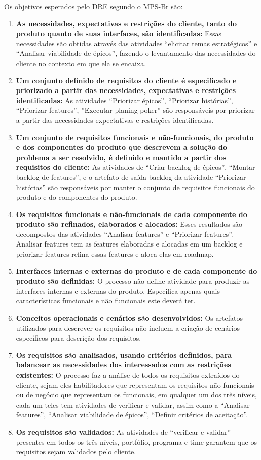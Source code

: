 Os objetivos esperados pelo DRE segundo o MPS-Br são:
\begin{enumerate}
\item \textbf{As necessidades, expectativas e restrições do cliente, tanto do produto quanto de suas interfaces, são identificadas:} Essas necessidades são obtidas através das atividades “elicitar temas estratégicos” e “Analisar viabilidade de épicos”, fazendo o levantamento das necessidades do cliente no contexto em que ela se encaixa.
\item \textbf{Um conjunto definido de requisitos do cliente é especificado e priorizado a partir das necessidades, expectativas e restrições identificadas:} As atividades “Priorizar épicos”, “Priorizar histórias”, “Priorizar features”, ”Executar planing poker” são responsáveis por priorizar a partir das necessidades expectativas e restrições identificadas.
\item \textbf{Um conjunto de requisitos funcionais e não-funcionais, do produto e dos componentes do produto que descrevem a solução do problema a ser resolvido, é definido e mantido a partir dos requisitos do cliente:} As atividades de “Criar backlog de épicos”, “Montar backlog de features”, e o artefato de saída backlog da atividade “Priorizar histórias” são responsáveis por manter o conjunto de requisitos funcionais do produto e do componentes do produto.
\item \textbf{Os requisitos funcionais e não-funcionais de cada componente do produto são refinados, elaborados e alocados:} Esses resultados são decompostos das atividades “Analisar features” e “Priorizar features”. Analisar features tem as features elaboradas e alocadas em um backlog e priorizar features refina essas features e aloca elas em roadmap.
\item \textbf{Interfaces internas e externas do produto e de cada componente do produto são definidas:} O processo não define atividade para produzir as interfaces internas e externas do produto. Especifica apenas quais características funcionais e não funcionais este deverá ter.
\item \textbf{Conceitos operacionais e cenários são desenvolvidos:} Os artefatos utilizados para descrever os requisitos não incluem a criação de cenários específicos para descrição dos requisitos.
\item \textbf{Os requisitos são analisados, usando critérios definidos, para balancear as necessidades dos interessados com as restrições existentes:} O processo faz a análise de todos os requisitos extraídos do cliente, sejam eles habilitadores que representam os requisitos não-funcionais ou de negócio que representam os funcionais, em qualquer um dos três níveis, cada um teles tem atividades de verificar e validar, assim como a “Analisar features”, “Analisar viabilidade de épicos”, “Definir critérios de aceitação”.
\item \textbf{Os requisitos são validados:} As atividades de “verificar e validar” presentes em todos os três níveis, portfólio, programa e time garantem que os requisitos sejam validados pelo cliente.
\end{enumerate}
